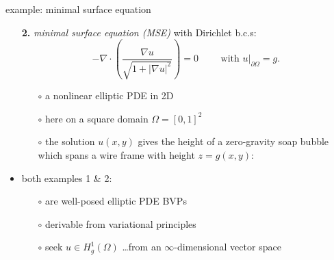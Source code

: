 \documentclass[hide notes,intlimits,usenames,dvipsnames]{beamer}
\newcommand{\grad}{\nabla}
\begin{document}
\begin{frame}{example: minimal surface equation}

\begin{itemize}
\item[\textbf{2.}] \emph{minimal surface equation (MSE)} with Dirichlet b.c.s:
	    $$- \grad\cdot \left(\frac{\grad u}{\sqrt{1 + |\grad u|^2}}\right) = 0  \qquad \text{ with } u\big|_{\partial \Omega} = g.$$
    \vspace{-2mm}
	\begin{itemize}
	\item[$\circ$] a nonlinear elliptic PDE in 2D
	\item[$\circ$] here on a square domain $\Omega = [0,1]^2$
	\item[$\circ$] the solution $u(x,y)$ gives the height of a zero-gravity soap bubble which spans a wire frame with height $z=g(x,y)$:
	\end{itemize}

\begin{center}
\end{center}

\vspace{-2mm}
\item both examples 1 \& 2:
	\begin{itemize}
	\item[$\circ$] are well-posed elliptic  PDE BVPs
	\item[$\circ$] derivable from variational principles
	\item[$\circ$] seek $u \in H_g^1(\Omega)$ \dots from an \alert{$\infty$-dimensional vector space}
	\end{itemize}
\end{itemize}
\end{frame}
\end{document}
